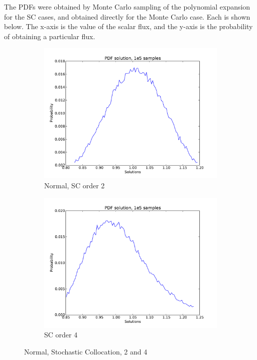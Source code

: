 \documentclass[11pt]{article} %
\begin{document}
The PDFs were obtained by Monte Carlo sampling of the polynomial expansion for the SC cases, and obtained directly for the Monte Carlo case.  Each is shown below.  The x-axis is the value of the scalar flux, and the y-axis is the probability of obtaining a particular flux.
\begin{figure}[h!]
\centering
  \begin{subfigure}[b]{0.45 \textwidth}
   \includegraphics[width=\textwidth]{1d_sc_2_n}
   \caption{Normal, SC order 2}
   \label{sc2}
  \end{subfigure}
  \begin{subfigure}[b]{0.45\textwidth}
   \includegraphics[width=\textwidth]{1d_sc_4_n}
   \caption{SC order 4}
   \label{Normal, sc4}
  \end{subfigure}
\caption{Normal, Stochastic Collocation, 2 and 4}
\end{figure}
\end{document}
